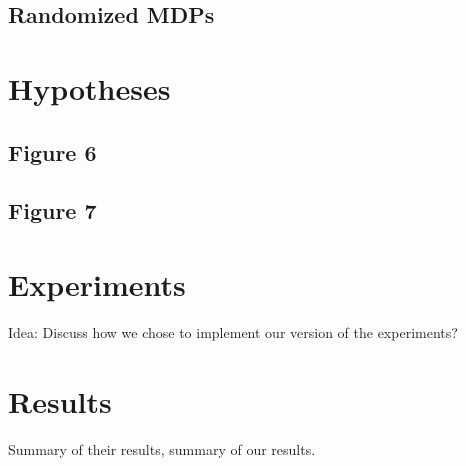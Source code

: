 \documentclass[11pt]{article} %
\begin{document}
\subsection{Randomized MDPs}



\section{Hypotheses}

\subsection{Figure 6}

\subsection{Figure 7}


\section{Experiments}

Idea: Discuss how we chose to implement our version of the experiments?



\section{Results}

Summary of their results, summary of our results.
\end{document}
